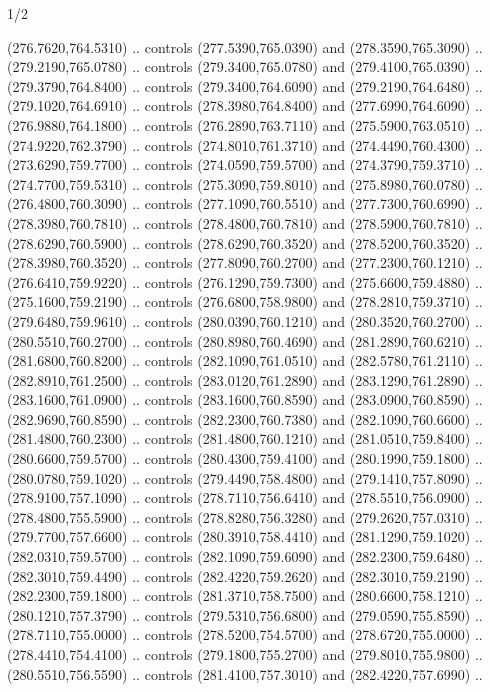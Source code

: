 \begin{flagdescription}{1/2}
\begin{scope}[xshift=0.5\flaglength]
\begin{scope}[scale=0.00745\flagwidth,xshift=-12.1mm,yshift=41.7mm]
\begin{scope}[y=0.80pt, x=0.80pt, yscale=-1, xscale=1, inner sep=0pt, outer sep=0pt]
\begin{scope}[cm={{1.33333,0.0,0.0,-1.33333,(0.0,114.66667)}}]
\begin{scope}[scale=0.100]
  (276.7620,764.5310) .. controls (277.5390,765.0390) and (278.3590,765.3090) ..
  (279.2190,765.0780) .. controls (279.3400,765.0780) and (279.4100,765.0390) ..
  (279.3790,764.8400) .. controls (279.3400,764.6090) and (279.2190,764.6480) ..
  (279.1020,764.6910) .. controls (278.3980,764.8400) and (277.6990,764.6090) ..
  (276.9880,764.1800) .. controls (276.2890,763.7110) and (275.5900,763.0510) ..
  (274.9220,762.3790) .. controls (274.8010,761.3710) and (274.4490,760.4300) ..
  (273.6290,759.7700) .. controls (274.0590,759.5700) and (274.3790,759.3710) ..
  (274.7700,759.5310) .. controls (275.3090,759.8010) and (275.8980,760.0780) ..
  (276.4800,760.3090) .. controls (277.1090,760.5510) and (277.7300,760.6990) ..
  (278.3980,760.7810) .. controls (278.4800,760.7810) and (278.5900,760.7810) ..
  (278.6290,760.5900) .. controls (278.6290,760.3520) and (278.5200,760.3520) ..
  (278.3980,760.3520) .. controls (277.8090,760.2700) and (277.2300,760.1210) ..
  (276.6410,759.9220) .. controls (276.1290,759.7300) and (275.6600,759.4880) ..
  (275.1600,759.2190) .. controls (276.6800,758.9800) and (278.2810,759.3710) ..
  (279.6480,759.9610) .. controls (280.0390,760.1210) and (280.3520,760.2700) ..
  (280.5510,760.2700) .. controls (280.8980,760.4690) and (281.2890,760.6210) ..
  (281.6800,760.8200) .. controls (282.1090,761.0510) and (282.5780,761.2110) ..
  (282.8910,761.2500) .. controls (283.0120,761.2890) and (283.1290,761.2890) ..
  (283.1600,761.0900) .. controls (283.1600,760.8590) and (283.0900,760.8590) ..
  (282.9690,760.8590) .. controls (282.2300,760.7380) and (282.1090,760.6600) ..
  (281.4800,760.2300) .. controls (281.4800,760.1210) and (281.0510,759.8400) ..
  (280.6600,759.5700) .. controls (280.4300,759.4100) and (280.1990,759.1800) ..
  (280.0780,759.1020) .. controls (279.4490,758.4800) and (279.1410,757.8090) ..
  (278.9100,757.1090) .. controls (278.7110,756.6410) and (278.5510,756.0900) ..
  (278.4800,755.5900) .. controls (278.8280,756.3280) and (279.2620,757.0310) ..
  (279.7700,757.6600) .. controls (280.3910,758.4410) and (281.1290,759.1020) ..
  (282.0310,759.5700) .. controls (282.1090,759.6090) and (282.2300,759.6480) ..
  (282.3010,759.4490) .. controls (282.4220,759.2620) and (282.3010,759.2190) ..
  (282.2300,759.1800) .. controls (281.3710,758.7500) and (280.6600,758.1210) ..
  (280.1210,757.3790) .. controls (279.5310,756.6800) and (279.0590,755.8590) ..
  (278.7110,755.0000) .. controls (278.5200,754.5700) and (278.6720,755.0000) ..
  (278.4410,754.4100) .. controls (279.1800,755.2700) and (279.8010,755.9800) ..
  (280.5510,756.5590) .. controls (281.4100,757.3010) and (282.4220,757.6990) ..

\end{scope}
\end{scope}
\end{scope}
\end{scope}
\end{scope}
\end{flagdescription}
